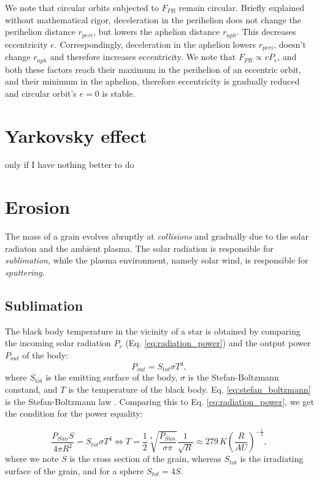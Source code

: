 We note that circular orbits subjected to $F_{PR}$ remain circular. Briefly explained without mathematical rigor, deceleration in the perihelion does not change the perihelion distance $r_{peri}$, but lowers the aphelion distance $r_{aph}$. This decreases eccentricity $e$. Correspondingly, deceleration in the aphelion lowers $r_{peri}$, doesn't change $r_{aph}$ and therefore increases eccentricity. We note that $F_{PR} \propto v P_r$, and both these factors reach their maximum in the perihelion of an eccentric orbit, and their minimum in the aphelion, therefore eccentricity is gradually reduced and circular orbit's $e=0$ is stable.

\section{Yarkovsky effect}

only if I have nothing better to do

\section{Erosion}

The mass of a grain evolves abruptly at \textit{collisions} and gradually due to the solar radiaton and the ambient plasma. The solar radiation is responsible for \textit{sublimation}, while the plasma environment, namely solar wind, is responsible for \textit{sputtering}. 

\subsection{Sublimation}

The black body temperature in the vicinity of a star is obtained by comparing the incoming solar radiation $P_{r}$ (Eq. \ref{eq:radiation_power}) and the output power $P_{out}$ of the body:
\begin{equation}
    P_{out} = S_{tot} \sigma T^4,
    \label{eq:stefan_boltzmann}
\end{equation}
where $S_{tot}$ is the emitting surface of the body, $\sigma$ is the Stefan-Boltzmann constand, and $T$ is the temperature of the black body. Eq. \ref{eq:stefan_boltzmann} is the Stefan-Boltzmann law \citep{stefan1879uber,boltzmann1884ableitnung}. Comparing this to Eq. \ref{eq:radiation_power}, we get the condition for the power equality:

\begin{equation}
    \frac{P_{Sun} S}{4 \pi R^2} = S_{tot} \sigma T^4 \Leftrightarrow T =  \frac{1}{2} \sqrt[4]{\frac{P_{Sun}}{\sigma \pi}} \frac{1}{\sqrt{R}} \approx 279 \, \si{K} \left(\frac{R}{\si{AU}}\right)^{-\frac{1}{2}}, 
\end{equation}
where we note $S$ is the cross section of the grain, whereas $S_{tot}$ is the irradiating surface of the grain, and for a sphere $S_{tot} = 4S$. 

